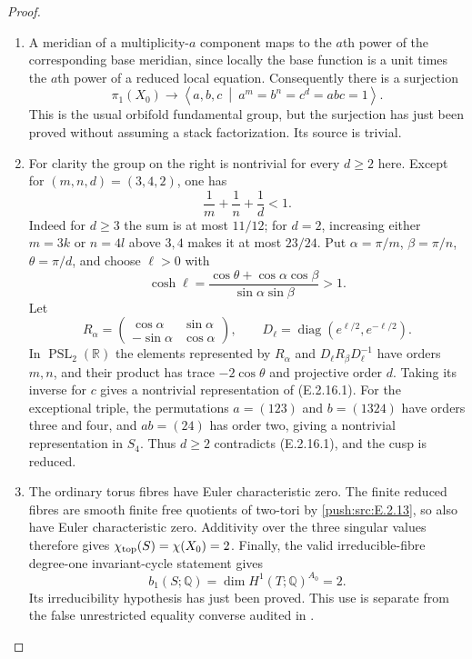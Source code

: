 \begin{proof}
\begin{enumerate}[label={$\langle1\rangle$\arabic*.},leftmargin=*]
\item A meridian of a multiplicity-$a$ component
maps to the $a$th power of the corresponding
base meridian, since locally the base
function is a unit times the $a$th power
of a reduced local equation.  Consequently
there is a surjection
\[
 \pi_1(X_0)\longrightarrow
 \left\langle a,b,c\ \middle|\
 a^m=b^n=c^d=abc=1\right\rangle.
 \tag{E.2.16.1}
\]
This is the usual orbifold fundamental
group, but the surjection has just been
proved without assuming a stack
factorization.  Its source is trivial.

\item For clarity the group on the right is
nontrivial for every $d\ge2$ here.
Except for $(m,n,d)=(3,4,2)$, one has
\[
 \frac1m+\frac1n+\frac1d<1.
\]
Indeed for $d\ge3$ the sum is at most
$11/12$; for $d=2$, increasing either
$m=3k$ or $n=4l$ above $3,4$ makes it
at most $23/24$.  Put
$\alpha=\pi/m$, $\beta=\pi/n$,
$\theta=\pi/d$, and choose $\ell>0$ with
\[
 \cosh\ell=
 \frac{\cos\theta+\cos\alpha\cos\beta}
      {\sin\alpha\sin\beta}>1.
\]
Let
\[
 R_\alpha=\begin{pmatrix}
 \cos\alpha&\sin\alpha\\
 -\sin\alpha&\cos\alpha
 \end{pmatrix},\qquad
 D_\ell=\operatorname{diag}(e^{\ell/2},e^{-\ell/2}).
\]
In $\operatorname{PSL}_2(\mathbb R)$ the
elements represented by $R_\alpha$ and
$D_\ell R_\beta D_\ell^{-1}$ have orders
$m,n$, and their product has trace
$-2\cos\theta$ and projective order $d$.
Taking its inverse for $c$ gives a
nontrivial representation of (E.2.16.1).
For the exceptional triple, the
permutations $a=(123)$ and $b=(1324)$
have orders three and four, and
$ab=(24)$ has order two, giving a
nontrivial representation in $S_4$.
Thus $d\ge2$ contradicts (E.2.16.1),
and the cusp is reduced.

\item The ordinary torus fibres have Euler
characteristic zero.  The finite reduced
fibres are smooth finite free quotients
of two-tori by \ref{push:src:E.2.13}, so also have
Euler characteristic zero.  Additivity
over the three singular values therefore
gives $\chi_{\rm top}(S)=\chi(X_0)=2$.
Finally, the valid irreducible-fibre
degree-one invariant-cycle statement
\cite[Corollary 3.7, arXiv version~1]{HondaViaclovsky2025D}
gives
\[
 b_1(S;\mathbb Q)=
 \dim H^1(T;\mathbb Q)^{A_0}=2.
\]
Its irreducibility hypothesis has just
been proved.  This use is separate from
the false unrestricted equality
converse audited in .

\end{enumerate}
\end{proof}
